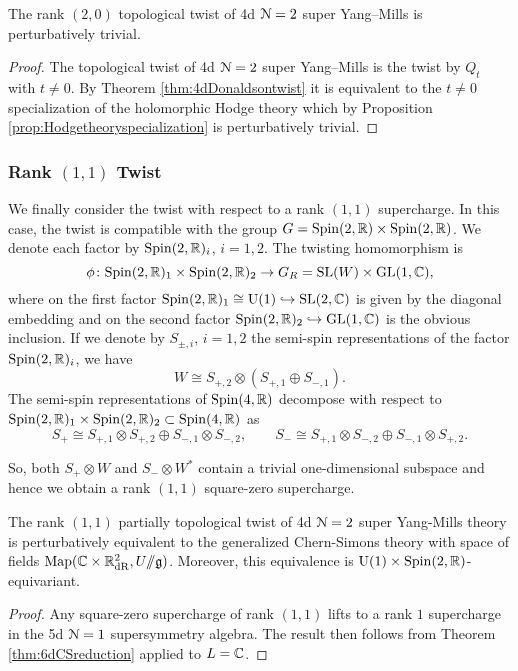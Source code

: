 \documentclass[10pt, oneside]{article}
\renewcommand{\U}{\mathrm{U}}
\newcommand{\ham}{/\!\!/}
\begin{document}
\begin{corollary}
The rank $(2,0)$ topological twist of 4d $\mathcal N=2$ super Yang--Mills is perturbatively trivial.
\label{cor:4dDonaldsontwist}
\end{corollary}
\begin{proof}
The topological twist of 4d $\mathcal N=2$ super Yang--Mills is the twist by $Q_t$ with $t\neq 0$. By Theorem \ref{thm:4dDonaldsontwist} it is equivalent to the $t\neq 0$ specialization of the holomorphic Hodge theory which by Proposition \ref{prop:Hodgetheoryspecialization} is perturbatively trivial.
\end{proof}

\subsubsection{Rank \texorpdfstring{$(1,1)$}{(1,1)} Twist}
\label{sect:4d_2_11}

We finally consider the twist with respect to a rank $(1,1)$ supercharge.
In this case, the twist is compatible with the group $G = \mathrm{Spin}(2, \mathbb R) \times \mathrm{Spin}(2, \mathbb R)$. 
We denote each factor by $\mathrm{Spin}(2, \mathbb R)_i$, $i=1,2$.  
The twisting homomorphism is
\[
\phi \colon \mathrm{Spin}(2, \mathbb R)_1 \times \mathrm{Spin}(2, \mathbb R)_2 \to G_R=\mathrm{SL}(W)\times \mathrm{GL}(1, \mathbb C),
\]
where on the first factor $\Spin(2, \RR)_1 \cong \U(1)\hookrightarrow \SL(2, \CC)$ is given by the diagonal embedding and on the second factor $\mathrm{Spin}(2, \mathbb R)_2 \hookrightarrow \mathrm{GL}(1, \mathbb C)$ is the obvious inclusion. 
If we denote by $S_{\pm, i}$, $i=1,2$ the semi-spin representations of the factor $\mathrm{Spin}(2, \mathbb R)_i$, we have
\[W \cong S_{+,2}\otimes (S_{+,1}\oplus S_{-,1}).\]
The semi-spin representations of $\mathrm{Spin}(4, \mathbb R)$ decompose with respect to $\mathrm{Spin}(2, \mathbb R)_1 \times \mathrm{Spin}(2, \mathbb R)_2\subset \mathrm{Spin}(4, \mathbb R)$ as
\[S_+\cong S_{+,1} \otimes S_{+,2} \oplus S_{-,1} \otimes S_{-,2},\qquad S_-\cong S_{+,1} \otimes S_{-,2} \oplus S_{-,1} \otimes S_{+,2}.\]

So, both $S_+\otimes W$ and $S_-\otimes W^*$ contain a trivial one-dimensional subspace and hence we obtain a rank $(1, 1)$ square-zero supercharge.

\begin{theorem} \label{thm:4d_11_twist}
The rank $(1,1)$ partially topological twist of 4d $\mathcal{N}=2$ super Yang-Mills theory is perturbatively equivalent to the generalized Chern-Simons theory with space of fields $\mr{Map}(\CC \times \RR^2_{\mr{dR}}, U\ham \gg)$.  
Moreover, this equivalence is $\U(1) \times \Spin(2, \RR)$-equivariant.
\end{theorem}
\begin{proof}
Any square-zero supercharge of rank $(1, 1)$ lifts to a rank $1$ supercharge in the 5d $\mathcal N=1$ supersymmetry algebra.
The result then follows from Theorem \ref{thm:6dCSreduction} applied to $L = \mathbb C$. 
\end{proof}
\end{document}
